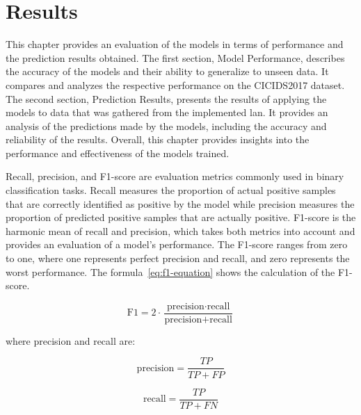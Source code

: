 \clearpage%
\vspace{21.5pt}


\chapter{Results}\label{ch:results}

This chapter provides an evaluation of the models in terms of performance and the prediction results obtained.
The first section, Model Performance, describes the accuracy of the models and their ability to generalize to unseen data.
It compares and analyzes the respective performance on the CICIDS2017 dataset.
The second section, Prediction Results, presents the results of applying the models to data that was gathered from the implemented \gls{lan}.
It provides an analysis of the predictions made by the models, including the accuracy and reliability of the results.
Overall, this chapter provides insights into the performance and effectiveness of the models trained.

Recall, precision, and F1-score are evaluation metrics commonly used in binary classification tasks.
Recall measures the proportion of actual positive samples that are correctly identified as positive by the model
while
precision measures the proportion of predicted positive samples that are actually positive.
F1-score is the harmonic mean of recall and precision, which takes both metrics into account and provides an evaluation of a model's performance.
The F1-score ranges from zero to one, where one represents perfect precision and recall, and zero represents the worst performance.
The formula~\ref{eq:f1-equation} shows the calculation of the F1-score.

\begin{equation}
    \text{F1} = 2 \cdot \frac{\text{precision} \cdot \text{recall}}{\text{precision} + \text{recall}}\label{eq:f1-equation}
\end{equation}

where precision and recall are:

\begin{equation}
    \text{precision} = \frac{TP}{TP+FP}\label{eq:f1-precision-equation}
\end{equation}

\begin{equation}
    \text{recall} = \frac{TP}{TP+FN}\label{eq:f1-recall-equation}
\end{equation}


